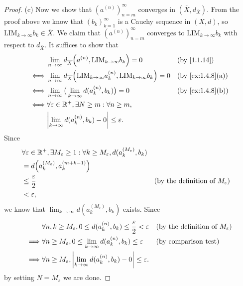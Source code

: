 \begin{proof}{(c)}
  Now we show that \((a^{(n)})_{n = m}^\infty\) converges in \((\overline{X}, d_{\overline{X}})\).
  From the proof above we know that \((b_k)_{k = 1}^\infty\) is a Cauchy sequence in \((X, d)\), so \(\text{LIM}_{k \to \infty} b_k \in \overline{X}\).
  We claim that \((a^{(n)})_{n = m}^\infty\) converges to \(\text{LIM}_{k \to \infty} b_k\) with respect to \(d_{\overline{X}}\).
  It suffices to show that
  \begin{align*}
         & \lim_{n \to \infty} d_{\overline{X}}\Big(a^{(n)}, \text{LIM}_{k \to \infty} b_k\Big) = 0                             &  & \by{1.1.14}                    \\
    \iff & \lim_{n \to \infty} d_{\overline{X}}\Big(\text{LIM}_{k \to \infty} a_k^{(n)}, \text{LIM}_{k \to \infty} b_k\Big) = 0 &  & \text{(by \cref{ex:1.4.8}(a))} \\
    \iff & \lim_{n \to \infty} \big(\lim_{k \to \infty} d(a_k^{(n)}, b_k)\big) = 0                                              &  & \text{(by \cref{ex:1.4.8}(b))} \\
    \iff & \forall \varepsilon \in \R^+, \exists N \geq m : \forall n \geq m,                                                                                       \\
         & \abs{\lim_{k \to \infty} d(a_k^{(n)}, b_k) - 0} \leq \varepsilon.
  \end{align*}
  Since
  \begin{align*}
     & \forall \varepsilon \in \mathbb{R}^+, \exists M_\varepsilon \geq 1 : \forall k \geq M_\varepsilon, d(a_k^{(M_\varepsilon)}, b_k)                                                      \\
     & = d\Big(a_k^{(M_\varepsilon)}, a_k^{(m + k - 1)}\Big)                                                                                                                         \\
     & \leq \dfrac{\varepsilon}{2}                                                                                              &  & \text{(by the definition of \(M_\varepsilon\))} \\
     & < \varepsilon,
  \end{align*}
  we know that \(\lim_{k \to \infty} d(a_k^{(M_\varepsilon)}, b_k)\) exists.
  Since
  \begin{align*}
             & \forall n, k \geq M_\varepsilon, 0 \leq d(a_k^{(n)}, b_k) \leq \dfrac{\varepsilon}{2} < \varepsilon &  & \text{(by the definition of \(M_\varepsilon\))} \\
    \implies & \forall n \geq M_\varepsilon, 0 \leq \lim_{k \to \infty} d(a_k^{(n)}, b_k) \leq \varepsilon         &  & \text{(by comparison test)}                     \\
    \implies & \forall n \geq M_\varepsilon, \left\lvert\lim_{k \to \infty} d(a_k^{(n)}, b_k) - 0\right\rvert \leq \varepsilon.
  \end{align*}
  by setting \(N = M_\varepsilon\) we are done.


\end{proof}
